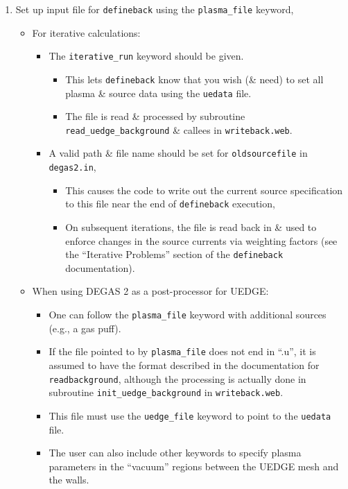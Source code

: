 \documentclass[11pt]{article}
\begin{document}
\begin{enumerate}
  \item Set up input file for {\tt defineback} using the \verb+plasma_file+ keyword,
  \begin{itemize}
    \item For iterative calculations:
    \begin{itemize}
      \item The \verb+iterative_run+ keyword should be given.
      \begin{itemize}
        \item This lets {\tt defineback} know that you wish (\& need) to set all plasma \& source data using the {\tt uedata} file.
        \item The file is read \& processed by subroutine \verb+read_uedge_background+ \& callees in {\tt writeback.web}.
      \end{itemize}
      \item A valid path \& file name should be set for \verb+oldsourcefile+ in {\tt degas2.in},
      \begin{itemize}
        \item This causes the code to write out the current source specification to this file near the end of {\tt defineback} execution,
        \item On subsequent iterations, the file is read back in \& used to enforce changes in the source currents via weighting factors (see the ``Iterative Problems'' section of the {\tt defineback} documentation).
      \end{itemize}
    \end{itemize}
    \item When using DEGAS 2 as a post-processor for UEDGE: 
    \begin{itemize}
      \item One can follow the \verb+plasma_file+ keyword with additional sources (e.g., a gas puff).
      \item If the file pointed to by \verb+plasma_file+ does not end in ``.u'', it is assumed to have the format described in the documentation for {\tt readbackground}, although the processing is actually done in subroutine \verb+init_uedge_background+ in {\tt writeback.web}.
      \item This file must use the \verb+uedge_file+ keyword to point to the {\tt uedata} file.
      \item The user can also include other keywords to specify plasma parameters in the ``vacuum'' regions between the UEDGE mesh and the walls.

\end{itemize}
\end{itemize}
\end{enumerate}
\end{document}
